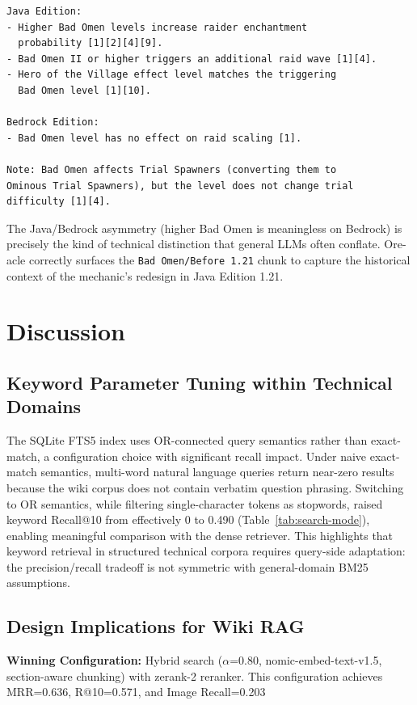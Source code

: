 \documentclass[11pt,a4paper]{article}
\begin{document}
\begin{lstlisting}
Java Edition:
- Higher Bad Omen levels increase raider enchantment
  probability [1][2][4][9].
- Bad Omen II or higher triggers an additional raid wave [1][4].
- Hero of the Village effect level matches the triggering
  Bad Omen level [1][10].

Bedrock Edition:
- Bad Omen level has no effect on raid scaling [1].

Note: Bad Omen affects Trial Spawners (converting them to
Ominous Trial Spawners), but the level does not change trial
difficulty [1][4].
\end{lstlisting}

\noindent The Java/Bedrock asymmetry (higher Bad Omen is meaningless on Bedrock) is precisely the kind of technical distinction that general LLMs often conflate. Ore-acle correctly surfaces the \texttt{Bad Omen/Before 1.21} chunk to capture the historical context of the mechanic's redesign in Java Edition 1.21.

\section{Discussion}

\subsection{Keyword Parameter Tuning within Technical Domains}

The SQLite FTS5 index uses OR-connected query semantics rather than exact-match, a configuration choice with significant recall impact. Under naive exact-match semantics, multi-word natural language queries return near-zero results because the wiki corpus does not contain verbatim question phrasing. Switching to OR semantics, while filtering single-character tokens as stopwords, raised keyword Recall@10 from effectively 0 to 0.490 (Table~\ref{tab:search-mode}), enabling meaningful comparison with the dense retriever. This highlights that keyword retrieval in structured technical corpora requires query-side adaptation: the precision/recall tradeoff is not symmetric with general-domain BM25 assumptions.

\subsection{Design Implications for Wiki RAG}
\textbf{Winning Configuration:} Hybrid search ($\alpha$=0.80, nomic-embed-text-v1.5, section-aware chunking) with zerank-2 reranker. This configuration achieves MRR=0.636, R@10=0.571, and Image Recall=0.203
\end{document}
